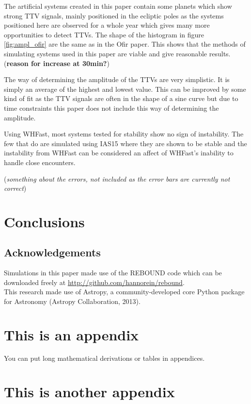 \documentclass[12pt]{report}
\newcommand{\mnras}{MNRAS}
\newcommand{\aap}{A\&A}
\begin{document}
	The artificial systems created in this paper contain some planets which show strong TTV signals, mainly positioned in the ecliptic poles as the systems positioned here are observed for a whole year which gives many more opportunities to detect TTVs. The shape of the histogram in figure \ref{fig:ampl_ofir} are the same as in the Ofir paper. This shows that the methods of simulating systems used in this paper are viable and give reasonable results. (\textbf{reason for increase at 30min?})
	
	The way of determining the amplitude of the TTVs are very simplistic. It is simply an average of the highest and lowest value. This can be improved by some kind of fit as the TTV signals are often in the shape of a sine curve but due to time constraints this paper does not include this way of determining the amplitude.
	
	Using WHFast, most systems tested for stability show no sign of instability. The few that do are simulated using IAS15 where they are shown to be stable and the instability from WHFast can be considered an affect of WHFast's inability to handle close encounters.
	
	(\textit{something about the errors, not included as the error bars are currently not correct})
\chapter{Conclusions}


\section*{Acknowledgements}

Simulations in this paper made use of the REBOUND code which can be downloaded freely at \url{http://github.com/hannorein/rebound}.\vspace{0.5cm}\\
This research made use of Astropy, a community-developed core Python package for Astronomy (Astropy Collaboration, 2013).

%




\begin{appendix}

\chapter{This is an appendix}
\label{ap:input_code}
You can put long mathematical derivations or tables in appendices.

\chapter{This is another appendix}

\end{appendix}
\end{document}
